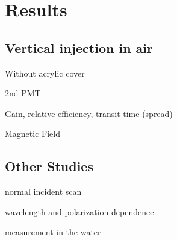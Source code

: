 \section{Results}

\subsection{Vertical injection in air}
Without acrylic cover

2nd PMT

Gain, relative efficiency, transit time (spread)

Magnetic Field


\subsection{Other Studies}

normal incident scan

wavelength and polarization dependence

measurement in the water
